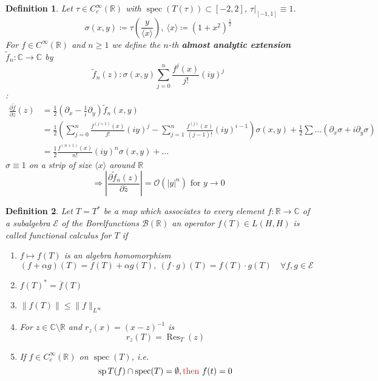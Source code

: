 \documentclass[12pt]{extreport} %
\newcommand{\C}{\mathbb{C}}
\newcommand{\R}{\mathbb{R}}
\theoremstyle{named}
\theoremstyle{nnamed}
\theoremstyle{itshape}
\newtheorem{definition}{Definition}  \counterwithin{definition}{chapter}
\theoremstyle{normal}
\begin{document}
\begin{definition}
	Let $\tau \in C_c^\infty(\R)$ with $\operatorname{spec}(T(\tau)) \subset [-2, 2]$, $\tau |_{[-1, 1]} \equiv 1$. %
		$$ \sigma(x, y) \coloneqq \tau \left( \frac{y}{\langle x \rangle} \right), ~\langle x \rangle \coloneqq \left( 1 + x^2 \right)^{\frac{1}{2}} $$
	For $f \in C^{\infty}(\R)$ and $n \geq 1$ we define the $n$-th \textbf{almost analytic extension} $\tilde{f}_n \colon \C \rightarrow \C$ by
		$$ \tilde{f}_n(z) \colon \sigma(x, y) \sum_{j=0}^n \frac{f^{j}(x)}{j!} \left(iy \right)^j $$
	: %
		\begin{align}
				\frac{\partial \tilde{f}}{\partial \overline{z}} (z) & = \frac{1}{2} \left( \partial_x - \frac{1}{i} \partial_y \right) \tilde{f}_n(x, y) \\
				& = \frac{1}{2} \left( \sum_{j=0}^{n} \frac{f^{(j+1)}(x)}{j!} \left(iy \right)^j - \sum_{j=1}^{n} \frac{f^{(j)}(x)}{(j-1)!} \left( i y \right)^{i-1} \right) \sigma(x,y)  + \frac{1}{2} \sum \dotsc \left( \partial_x \sigma + i \partial_y \sigma \right) \\
				& = \frac{1}{2} \frac{f^{(n+1)}(x)}{n!}	\left( iy \right)^n \sigma(x,y) + \dotsc
		\end{align}
		$\sigma \equiv 1$ on a strip of size $\langle x \rangle$ around $\R$
		$$ \Rightarrow \left| \frac{\partial \tilde{f}_n(z)}{\partial \overline{z}} \right| = \mathcal{O} \left( \left| y \right|^n \right) \text{ for } y \rightarrow 0 $$
\end{definition}

\begin{definition}
	Let $T = T^*$ be a map which associates to every element $f \colon \R \rightarrow \C$ of a subalgebra $\mathcal{E}$ of the Borelfunctions $\mathcal{B}(\R)$ an operator $f(T) \in L(H, H)$ is called functional calculus for $T$ if
	\begin{enumerate}[label=\roman*\upshape)]
		\item $f \mapsto f(T)$ is an algebra homomorphism
			$$ \left( f + \alpha g \right)(T) = f(T) + \alpha g(T), ~ \left(f \cdot g \right) (T) = f(T) \cdot g(T) \quad \forall f,g \in \mathcal{E} $$
		\item $f(T)^* = \overline{f}(T)$
		\item $\| f(T) \| \leq \| f \|_{L^\infty}$
		\item For $z \in \C \setminus \R$ and $r_z(x) = (x - z)^{-1}$ is 
			$$ r_z(T) = \operatorname{Res}_T(z) $$
		\item If $f \in C_c^\infty(\R)$  on $\operatorname{spec}(T)$, i.e.
			$$ \operatorname{sp} T(f) \cap \operatorname{spec}(T) = \emptyset, \text{\color{red} then } f(t) = 0  $$ %
	\end{enumerate}
\end{definition}
\end{document}

